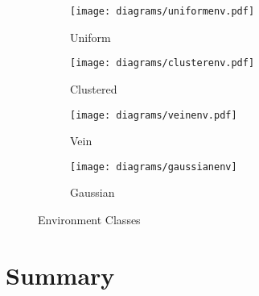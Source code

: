 \vspace{-2em}
\begin{figure} [h]
        \centering
        \begin{subfigure}[b]{0.21\textwidth}
                \texttt{[image: diagrams/uniformenv.pdf]}
                \caption{Uniform}
                \label{fig:uniformenv}
        \end{subfigure}%
        \begin{subfigure}[b]{0.205\textwidth}
                \texttt{[image: diagrams/clusterenv.pdf]}
                \caption{Clustered}
                \label{fig:clusterenv}
        \end{subfigure}
        \begin{subfigure}[b]{0.2\textwidth}
                \texttt{[image: diagrams/veinenv.pdf]}
                \caption{Vein}
                \label{fig:veinenv}
        \end{subfigure}  
        \begin{subfigure}[b]{0.2\textwidth}
                        \texttt{[image: diagrams/gaussianenv]}
                        \caption{Gaussian}
                        \label{fig:gaussianenv}
       \end{subfigure}
        \caption{Environment Classes}\label{fig:environments}
\end{figure}


\section{Summary}
\label{fourth:summary}

